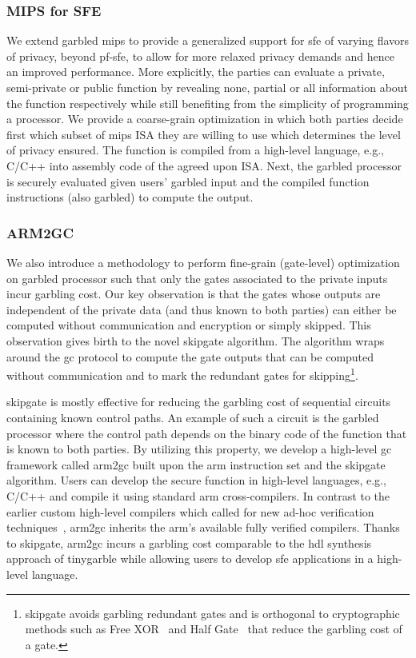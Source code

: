 \subsubsection{MIPS for SFE}
We extend garbled mips to provide a generalized support for \acrshort{sfe} of varying flavors of privacy, beyond \acrshort{pf-sfe}, to allow for more relaxed privacy demands and hence an improved performance.
More explicitly, the parties can evaluate a private, semi-private or public function by revealing none, partial or all information about the function respectively while still benefiting from the simplicity of programming a processor.
We provide a coarse-grain optimization in which both parties decide first which subset of mips ISA they are willing to use which determines the level of privacy ensured.
The function is compiled from a high-level language, e.g., C/C++ into assembly code of the agreed upon ISA. Next, the garbled processor is securely evaluated given users' garbled input and the compiled function instructions (also garbled) to compute the output.

\subsubsection{ARM2GC}
We also introduce a methodology to perform fine-grain (gate-level) optimization on garbled processor such that only the gates associated to the private inputs incur garbling cost.
Our key observation is that the gates whose outputs are independent of the private data (and thus known to both parties) can either be computed without communication and encryption or simply skipped.
This observation gives birth to the novel \gls{skipgate} algorithm.
The algorithm wraps around the \acrshort{gc} protocol to compute the gate outputs that can be computed without communication and to mark the redundant gates for skipping\footnote{\gls{skipgate} avoids garbling redundant gates and is orthogonal to cryptographic methods such as Free XOR~\cite{kolesnikov2008improved} and Half Gate~\cite{zahur2015two} that reduce the garbling cost of a gate.}.

\gls{skipgate} is mostly effective for reducing the garbling cost of sequential circuits containing known control paths.
An example of such a circuit is the garbled processor where the control path depends on the binary code of the function that is known to both parties.
By utilizing this property, we develop a high-level \acrshort{gc} framework called \gls{arm2gc} built upon the \gls{arm} instruction set and the \gls{skipgate} algorithm.
Users can develop the secure function in high-level languages, e.g., C/C++ and compile it using standard \gls{arm} cross-compilers.
In contrast to the earlier custom high-level compilers which called for new ad-hoc verification techniques~\cite{rastogi2014wysteria,demmler2015aby,liu2015oblivm,mood2016frigate}, \gls{arm2gc} inherits the \gls{arm}'s available fully verified compilers.
Thanks to \gls{skipgate}, \gls{arm2gc} incurs a garbling cost comparable to the \acrshort{hdl} synthesis approach of \gls{tinygarble} while allowing users to develop \acrshort{sfe} applications in a high-level language.

